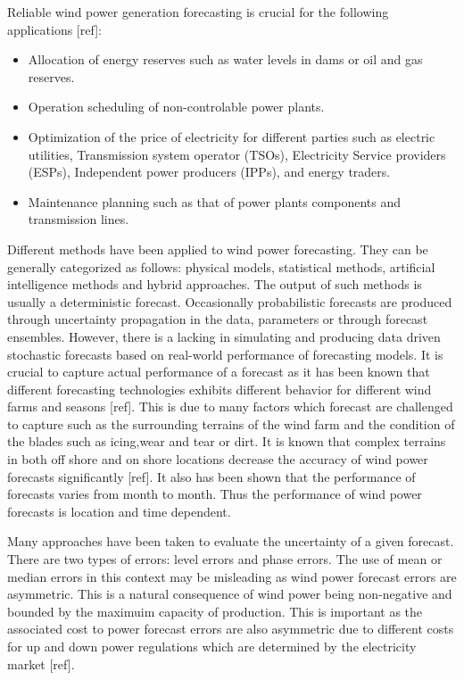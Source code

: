 \documentclass[10pt,twocolumn,letterpaper]{article}
\begin{document}
Reliable wind power generation forecasting is crucial for the following applications [ref]:
\begin{itemize}
\item Allocation of energy reserves such as water levels in dams or oil and gas reserves.
\item Operation scheduling of non-controlable power plants.
\item Optimization of the price of electricity for different parties such as electric utilities, Transmission system operator (TSOs), Electricity Service providers (ESPs), Independent power producers (IPPs), and energy traders.
\item Maintenance planning such as that of power plants components and transmission lines.

\end{itemize}

Different methods have been applied to wind power forecasting. They can be generally categorized as follows: physical models, statistical methods, artificial intelligence methods and hybrid approaches. The output of such methods is usually a deterministic forecast. Occasionally probabilistic forecasts are produced through uncertainty propagation in the data, parameters or through forecast ensembles. However, there is a lacking in simulating and producing data driven stochastic forecasts based on real-world performance of forecasting models. It is crucial to capture actual performance of a forecast as it has been known that different forecasting technologies exhibits different behavior for different wind farms and seasons [ref]. This is due to many factors which forecast are challenged to capture such as the surrounding terrains of the wind farm and the condition of the blades such as icing,wear and tear or dirt. It is known that complex terrains in both off shore and on shore locations decrease the accuracy of wind power forecasts significantly [ref]. It also has been shown that the performance of forecasts varies from month to month. Thus the performance of wind power forecasts is location and time dependent.

Many approaches have been taken to evaluate the uncertainty of a given forecast. There are two types of errors: level errors and phase errors. The use of mean or median errors in this context may be misleading as wind power forecast errors are asymmetric. This is a natural consequence of wind power being non-negative and bounded by the maximuim capacity of production. This is important as the associated cost to power forecast errors are also asymmetric due to different costs for up and down  power regulations which are determined by the electricity market [ref].
\end{document}
